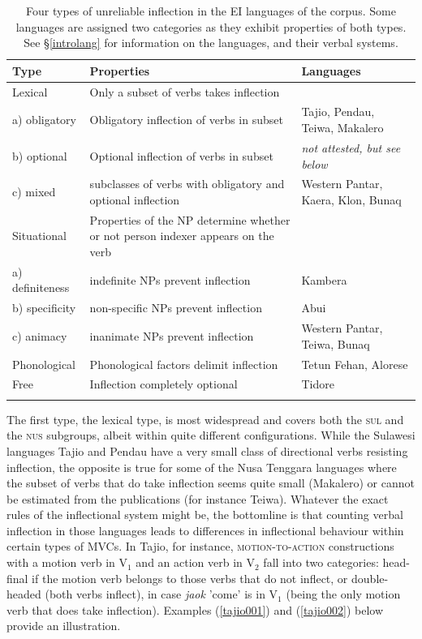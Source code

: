 \begin{table}
\begin{tabularx}{\textwidth}{l QQ}
  \lsptoprule
Type & Properties & Languages \tabularnewline 
  \midrule
Lexical & Only a subset of verbs takes inflection &  \tabularnewline
a) obligatory & Obligatory inflection of verbs in subset & Tajio, Pendau, Teiwa, Makalero \tabularnewline
b) optional & Optional inflection of verbs in subset & \textit{not attested, but see below} \tabularnewline
c) mixed & subclasses of verbs with obligatory and optional inflection & Western Pantar, Kaera, Klon, Bunaq \tabularnewline
\midrule
Situational & Properties of the NP determine whether or not person indexer appears on the verb & \tabularnewline
a) definiteness & indefinite NPs prevent inflection & Kambera \tabularnewline
b) specificity & non-specific NPs prevent inflection & Abui \tabularnewline
c) animacy & inanimate NPs prevent inflection & Western Pantar, Teiwa, Bunaq \tabularnewline
\midrule
Phonological & Phonological factors delimit inflection & Tetun Fehan, Alorese \tabularnewline
\midrule
Free & Inflection completely optional & Tidore \tabularnewline
   \lspbottomrule
\end{tabularx}
\caption[Types of unreliable inflection in EI languages]{Four types of unreliable inflection in the EI languages of the corpus. Some languages are assigned two categories as they exhibit properties of both types. See §\ref{introlang} for information on the languages, and their verbal systems.}
\label{table:unreliable}
\end{table}

The first type, the lexical type, is most widespread and covers both the \textsc{sul} and the \textsc{nus} subgroups, albeit within quite different configurations. While the Sulawesi languages Tajio and Pendau have a very small class of directional verbs resisting inflection, the opposite is true for some of the Nusa Tenggara languages where the subset of verbs that do take inflection seems quite small (Makalero) or cannot be estimated from the publications (for instance Teiwa). Whatever the exact rules of the inflectional system might be, the bottomline is that counting verbal inflection in those languages leads to differences in inflectional behaviour within certain types of MVCs. In Tajio, for instance, \textsc{motion-to-action} constructions with a motion verb in V$_1$ and an action verb in V$_2$  fall into two categories: head-final if the motion verb belongs to those verbs that do not inflect, or double-headed (both verbs inflect), in case \textit{jaok} 'come' is in V$_1$ (being the only motion verb that does take inflection). Examples (\ref{tajio001}) and (\ref{tajio002}) below provide an illustration.


